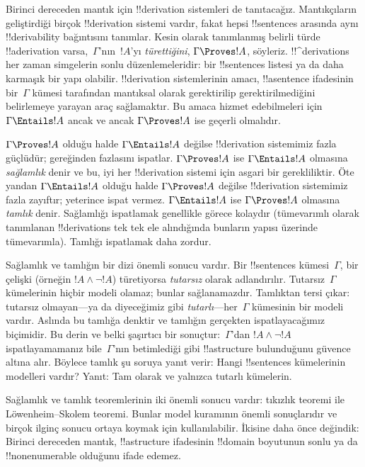 \documentclass[../../../include/open-logic-section]{subfiles}
\begin{document}


Birinci dereceden mantık için !!{derivation} sistemleri de tanıtacağız.
Mantıkçıların geliştirdiği birçok !!{derivation} sistemi vardır, fakat
hepsi !!{sentence}s arasında aynı !!{derivability} bağıntısını
tanımlar. Kesin olarak tanımlanmış belirli türde !!a{derivation}
varsa,~$\Gamma$'nın~$!A$'yı \emph{türettiğini},
$\Gamma\Proves !A$, söyleriz. !!^{derivation}s her zaman simgelerin
sonlu düzenlemeleridir: bir !!{sentence}s listesi ya da daha karmaşık
bir yapı olabilir. !!{derivation} sistemlerinin amacı, !!a{sentence}
ifadesinin bir~$\Gamma$ kümesi tarafından mantıksal olarak gerektirilip
gerektirilmediğini belirlemeye yarayan araç sağlamaktır. Bu amaca
hizmet edebilmeleri için $\Gamma\Entails !A$ ancak ve ancak
$\Gamma\Proves !A$ ise geçerli olmalıdır.

$\Gamma\Proves !A$ olduğu halde $\Gamma\Entails !A$ değilse
!!{derivation} sistemimiz fazla güçlüdür; gereğinden fazlasını
ispatlar. $\Gamma\Proves !A$ ise $\Gamma\Entails !A$ olmasına
\emph{sağlamlık} denir ve bu, iyi her !!{derivation} sistemi için
asgari bir gerekliliktir. Öte yandan $\Gamma\Entails !A$ olduğu halde
$\Gamma\Proves !A$ değilse !!{derivation} sistemimiz fazla zayıftır;
yeterince ispat vermez. $\Gamma\Entails !A$ ise $\Gamma\Proves !A$
olmasına \emph{tamlık} denir. Sağlamlığı ispatlamak genellikle görece
kolaydır (tümevarımlı olarak tanımlanan !!{derivation}s tek tek ele
alındığında bunların yapısı üzerinde tümevarımla). Tamlığı ispatlamak
daha zordur.

Sağlamlık ve tamlığın bir dizi önemli sonucu vardır. Bir
!!{sentence}s kümesi~$\Gamma$, bir çelişki (örneğin
$!A\land\lnot !A$) türetiyorsa \emph{tutarsız} olarak adlandırılır.
Tutarsız~$\Gamma$ kümelerinin hiçbir modeli olamaz; bunlar
sağlanamazdır. Tamlıktan tersi çıkar: tutarsız olmayan---ya da
diyeceğimiz gibi \emph{tutarlı}---her~$\Gamma$ kümesinin bir modeli
vardır. Aslında bu tamlığa denktir ve tamlığın gerçekten ispatlayacağımız
biçimidir. Bu derin ve belki şaşırtıcı bir sonuçtur:~$\Gamma$'dan
$!A\land\lnot !A$ ispatlayamamanız bile~$\Gamma$'nın betimlediği gibi
!!a{structure} bulunduğunu güvence altına alır. Böylece tamlık şu
soruya yanıt verir: Hangi !!{sentence}s kümelerinin modelleri vardır?
Yanıt: Tam olarak ve yalnızca tutarlı kümelerin.

Sağlamlık ve tamlık teoremlerinin iki önemli sonucu vardır: tıkızlık
teoremi ile Löwenheim--Skolem teoremi. Bunlar model kuramının önemli
sonuçlarıdır ve birçok ilginç sonucu ortaya koymak için kullanılabilir.
İkisine daha önce değindik: Birinci dereceden mantık, !!a{structure}
ifadesinin !!{domain} boyutunun sonlu ya da !!{nonenumerable} olduğunu
ifade edemez.
\end{document}
